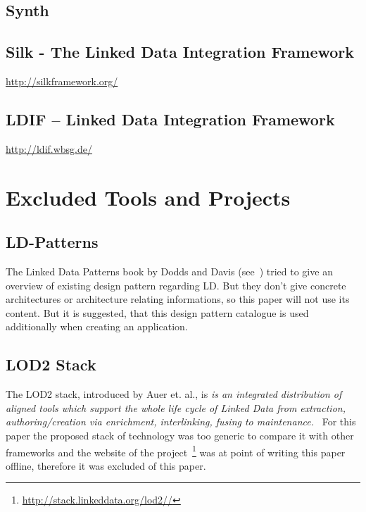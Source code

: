 \subsection{Synth}

\subsection{Silk - The Linked Data Integration Framework}\label{silk}
\url{http://silkframework.org/}
\cite{volz2009silk}
\cite{jentzsch2010silk}
\cite{isele2010silk}

\subsection{LDIF – Linked Data Integration Framework}
\url{http://ldif.wbsg.de/}
\cite{schultz2011ldif}
\cite{schultz2012ldif}

\section{Excluded Tools and Projects}

\subsection{LD-Patterns}
The Linked Data Patterns book by Dodds and Davis (see~\cite{dodds2011linked}) tried to give an overview of existing design pattern regarding LD. But they don't give concrete architectures or architecture relating informations, so this paper will not use its content. But it is suggested, that this design pattern catalogue is used additionally when creating an application.

\subsection{LOD2 Stack}

The LOD2 stack, introduced by Auer et. al., is \emph{is an integrated distribution of aligned tools which support the whole life cycle of Linked Data from extraction, authoring/creation via enrichment, interlinking, fusing to maintenance.}~\cite{auer2012managing} For this paper the proposed stack of technology was too generic to compare it with other frameworks and the website of the project~\footnote{\url{http://stack.linkeddata.org/lod2//}} was at point of writing this paper offline, therefore it was excluded of this paper.

